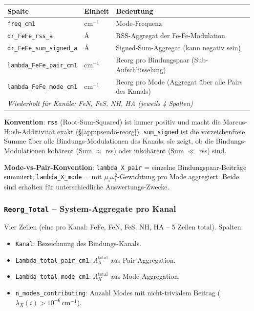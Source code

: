 \documentclass[11pt,a4paper,twoside]{article}
\providecommand{\angstrom}{\text{\AA}}    %
\theoremstyle{remark}
\begin{document}
\begin{center}
\small
\begin{tabular}{p{4.0cm}p{1.4cm}p{7.6cm}}
\toprule
\textbf{Spalte} & \textbf{Einheit} & \textbf{Bedeutung} \\
\midrule
\texttt{freq\_cm1}                  & cm$^{-1}$ & Mode-Frequenz \\
\texttt{dr\_FeFe\_rss\_a}           & $\angstrom$ & RSS-Aggregat
                                                    der Fe-Fe-Modulation \\
\texttt{dr\_FeFe\_sum\_signed\_a}   & $\angstrom$ & Signed-Sum-Aggregat
                                                    (kann negativ sein) \\
\texttt{lambda\_FeFe\_pair\_cm1}    & cm$^{-1}$ & Reorg pro Bindungspaar
                                                  (Sub-Aufschl\"usselung) \\
\texttt{lambda\_FeFe\_mode\_cm1}    & cm$^{-1}$ & Reorg pro Mode
                                                  (Aggregat \"uber alle
                                                  Pairs des Kanals) \\
\midrule
\multicolumn{3}{l}{\textit{Wiederholt f\"ur Kan\"ale: FeN, FeS, NH, HA
       (jeweils 4 Spalten)}} \\
\bottomrule
\end{tabular}
\end{center}

\textbf{Konvention}: \texttt{rss} (Root-Sum-Squared) ist immer
positiv und macht die Marcus-Hush-Additivit\"at exakt
(\S\ref{app:pseudo-reorg}). \texttt{sum\_signed} ist die vorzeichenfreie
Summe \"uber alle Bindungs-Modulationen des Kanals; sie zeigt, ob
die Bindungs-Modulationen koh\"arent (Sum $\approx$ rss) oder
inkoh\"arent (Sum $\ll$ rss) sind.

\textbf{Mode-vs-Pair-Konvention}: \texttt{lambda\_X\_pair} = einzelne
Bindungspaar-Beitr\"age summiert; \texttt{lambda\_X\_mode} = mit
$\mu_i\omega_i^2$-Gewichtung pro Mode aggregiert. Beide sind
erhalten f\"ur unterschiedliche Auswertungs-Zwecke.

\subsubsection*{\texttt{Reorg\_Total} -- System-Aggregate pro Kanal}

Vier Zeilen (eine pro Kanal: FeFe, FeN, FeS, NH, HA -- 5 Zeilen
total). Spalten:

\begin{itemize}\setlength{\itemsep}{0pt}
  \item \texttt{Kanal}: Bezeichnung des Bindungs-Kanals.
  \item \texttt{Lambda\_total\_pair\_cm1}: $\Lambda_X^\text{total}$
        aus Pair-Aggregation.
  \item \texttt{Lambda\_total\_mode\_cm1}: $\Lambda_X^\text{total}$
        aus Mode-Aggregation.
  \item \texttt{n\_modes\_contributing}: Anzahl Modes mit
        nicht-trivialem Beitrag ($\lambda_X(i) > 10^{-6}$\,cm$^{-1}$).
\end{itemize}
\end{document}

